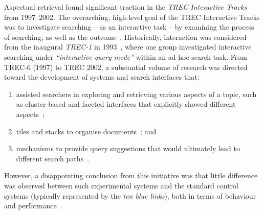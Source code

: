 
Aspectual retrieval found significant traction in the \textit{TREC Interactive Tracks} from $1997$--$2002$. The overarching, high-level goal of the TREC Interactive Tracks was to investigate searching -- as an interactive task -- by examining the process of searching, as well as the outcome~\cite{over2001trec}. Historically, interaction was considered from the inaugural \emph{TREC-1} in 1993~\cite{harman1993trec1}, where one group investigated interactive searching under \emph{``interactive query mode''} within an ad-hoc search task. From TREC-6 (1997) to TREC 2002, a substantial volume of research was directed toward the development of systems and search interfaces that: 
\begin{enumerate}
\item assisted searchers in exploring and retrieving various aspects of a topic, such as cluster-based and faceted interfaces that explicitly showed different aspects~\cite{mcdonald1998interactive,villa2009aspect_interface}; 
\item tiles and stacks to organise documents~\cite{harper2006piling,hearst1995tilebars,hearst1997texttiling,iwata2012tilediversified}; and 
\item mechanisms to provide query suggestions that would ultimately lead to different search paths~\cite{umemoto2016scentbar,kato2012query_suggestion}. 
\end{enumerate}
However, a disappointing conclusion from this initiative was that little difference was observed between such experimental systems and the standard control systems (typically represented by the \emph{ten blue links}), both in terms of behaviour and performance~\cite{voorhees05trec}.

